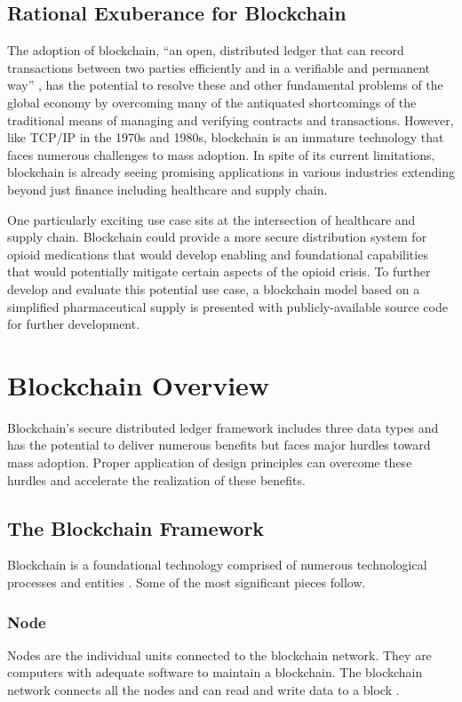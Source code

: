 \documentclass[sigconf]{acmart}
\begin{document}
\subsection{Rational Exuberance for Blockchain}
The adoption of blockchain, ``an open, distributed ledger that can record transactions between two parties efficiently and in a verifiable and permanent way'' \cite{hbr}, has the potential to resolve these and other fundamental problems of the global economy by overcoming many of the antiquated shortcomings of the traditional means of managing and verifying contracts and transactions. However, like TCP/IP in the 1970s and 1980s, blockchain is an immature technology that faces numerous challenges to mass adoption. In spite of its current limitations, blockchain is already seeing promising applications in various industries extending beyond just finance including healthcare and supply chain.

One particularly exciting use case sits at the intersection of healthcare and supply chain. Blockchain could provide a more secure distribution system for opioid medications that would develop enabling and foundational capabilities that would potentially mitigate certain aspects of the opioid crisis. To further develop and evaluate this potential use case, a blockchain model based on a simplified pharmaceutical supply is presented with publicly-available source code for further development.





\section{Blockchain Overview}
Blockchain's secure distributed ledger framework includes three data types and has the potential to deliver numerous benefits but faces major hurdles toward mass adoption. Proper application of design principles can overcome these hurdles and accelerate the realization of these benefits.

\subsection{The Blockchain Framework}
Blockchain is a foundational technology comprised of numerous technological processes and entities \cite{hbr}. Some of the most significant pieces follow.

\subsubsection{Node} Nodes are the individual units connected to the blockchain network. They are computers with adequate software to maintain a blockchain. The blockchain network connects all the nodes and can read and write data to a block \cite{pabc1} \cite{pabc2}.
\end{document}
